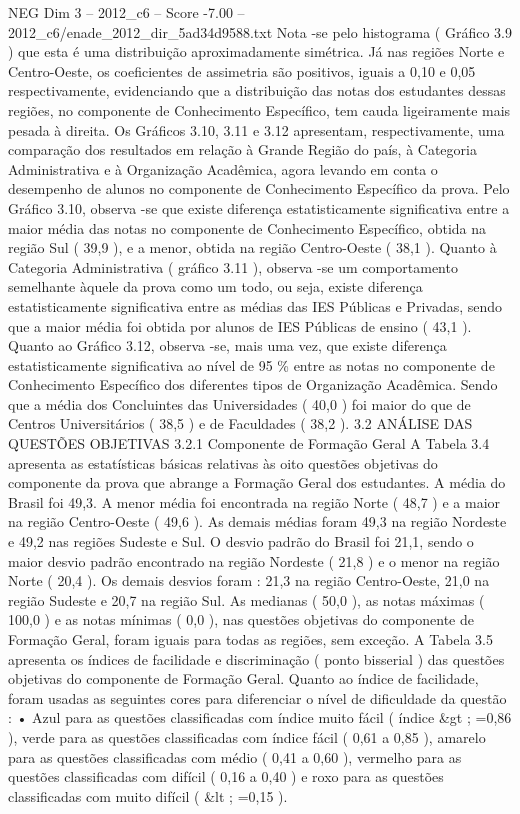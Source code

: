 \begin{textsample}{NEG Dim 3 – 2012\_c6 – Score -7.00 – 2012\_c6/enade\_2012\_dir\_5ad34d9588.txt}
Nota -se pelo histograma ( Gráfico 3.9 ) que esta é uma distribuição aproximadamente simétrica.
Já nas regiões Norte e Centro-Oeste, os coeficientes de assimetria são positivos, iguais a 0,10 e 0,05 respectivamente, evidenciando que a distribuição das notas dos estudantes dessas regiões, no componente de Conhecimento Específico, tem cauda ligeiramente mais pesada à direita.
Os Gráficos 3.10, 3.11 e 3.12 apresentam, respectivamente, uma comparação dos resultados em relação à Grande Região do país, à Categoria Administrativa e à Organização Acadêmica, agora levando em conta o desempenho de alunos no componente de Conhecimento Específico da prova.
Pelo Gráfico 3.10, observa -se que existe diferença estatisticamente significativa entre a maior média das notas no componente de Conhecimento Específico, obtida na região Sul ( 39,9 ), e a menor, obtida na região Centro-Oeste ( 38,1 ).
Quanto à Categoria Administrativa ( gráfico 3.11 ), observa -se um comportamento semelhante àquele da prova como um todo, ou seja, existe diferença estatisticamente significativa entre as médias das IES Públicas e Privadas, sendo que a maior média foi obtida por alunos de IES Públicas de ensino ( 43,1 ).
Quanto ao Gráfico 3.12, observa -se, mais uma vez, que existe diferença estatisticamente significativa ao nível de 95 \% entre as notas no componente de Conhecimento Específico dos diferentes tipos de Organização Acadêmica.
Sendo que a média dos Concluintes das Universidades ( 40,0 ) foi maior do que de Centros Universitários ( 38,5 ) e de Faculdades ( 38,2 ). 3.2 ANÁLISE DAS QUESTÕES OBJETIVAS 3.2.1 Componente de Formação Geral A Tabela 3.4 apresenta as estatísticas básicas relativas às oito questões objetivas do componente da prova que abrange a Formação Geral dos estudantes.
A média do Brasil foi 49,3.
A menor média foi encontrada na região Norte ( 48,7 ) e a maior na região Centro-Oeste ( 49,6 ).
As demais médias foram 49,3 na região Nordeste e 49,2 nas regiões Sudeste e Sul.
O desvio padrão do Brasil foi 21,1, sendo o maior desvio padrão encontrado na região Nordeste ( 21,8 ) e o menor na região Norte ( 20,4 ).
Os demais desvios foram : 21,3 na região Centro-Oeste, 21,0 na região Sudeste e 20,7 na região Sul.
As medianas ( 50,0 ), as notas máximas ( 100,0 ) e as notas mínimas ( 0,0 ), nas questões objetivas do componente de Formação Geral, foram iguais para todas as regiões, sem exceção.
A Tabela 3.5 apresenta os índices de facilidade e discriminação ( ponto bisserial ) das questões objetivas do componente de Formação Geral.
Quanto ao índice de facilidade, foram usadas as seguintes cores para diferenciar o nível de dificuldade da questão : • Azul para as questões classificadas com índice muito fácil ( índice \&gt ; =0,86 ), verde para as questões classificadas com índice fácil ( 0,61 a 0,85 ), amarelo para as questões classificadas com médio ( 0,41 a 0,60 ), vermelho para as questões classificadas com difícil ( 0,16 a 0,40 ) e roxo para as questões classificadas com muito difícil ( \&lt ; =0,15 ).

\end{textsample}
